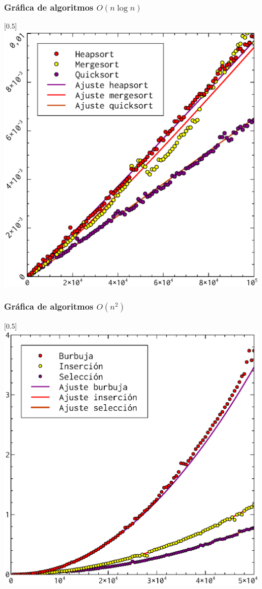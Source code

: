 \documentclass[compress]{beamer}
\begin{document}
\begin{frame}
\frametitle{Gráfica de algoritmos $O(n\log n)$}
	\begin{center}
\scalebox{0.53}[0.5]{
    \includegraphics[]{nlogn_ajuste.eps}
}
\end{center}
\end{frame}
\begin{frame}
\frametitle{Gráfica de algoritmos $O(n^2)$}
\begin{center}
\scalebox{0.53}[0.5]{
    \includegraphics[]{n2_ajuste}
}
\end{center}
\end{frame}
\end{document}
